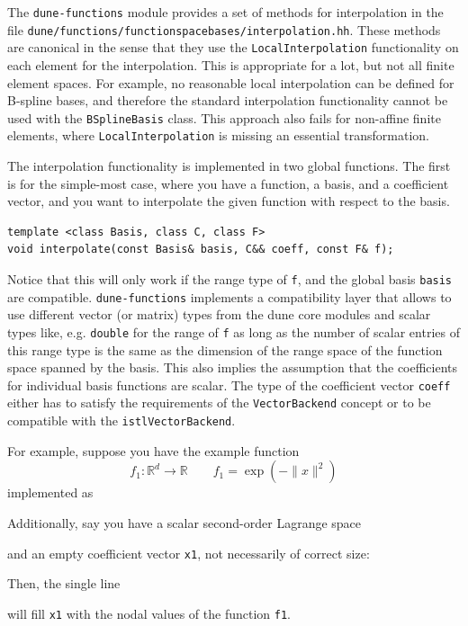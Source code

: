 \documentclass[a4paper,10pt,headings=normal,bibliography=totoc]{scrartcl}
\newcommand{\cpp}[1]{\lstinline[basicstyle=\ttfamily]!#1!}
\newcommand{\R}{\mathbb{R}}
\newcommand{\norm}[1]{\lVert#1\rVert}
\newcommand{\dunemodule}[1]{\texttt{#1}}
\newcommand{\file}[1]{\texttt{#1}}
\begin{document}
The \dunemodule{dune-functions} module provides a set of methods for interpolation in the file
\file{dune/functions/functionspacebases/interpolation.hh}.  These methods are canonical in the sense that
they use the \cpp{LocalInterpolation} functionality on each element for the interpolation.  This is appropriate
for a lot, but not all finite element spaces.  For example, no reasonable local interpolation can be defined
for B-spline bases, and therefore the standard interpolation functionality cannot be used with the
\cpp{BSplineBasis} class.
This approach also fails for non-affine finite elements, where \cpp{LocalInterpolation} is
missing an essential transformation.

The interpolation functionality is implemented in two global functions.
The first is for the simple-most case, where you have a function,
a basis, and a coefficient vector, and you want to interpolate
the given function with respect to the basis.

\begin{lstlisting}[style=Interface]
template <class Basis, class C, class F>
void interpolate(const Basis& basis, C&& coeff, const F& f);
\end{lstlisting}

Notice that this will only work if the range type of \cpp{f},
and the global basis \cpp{basis} are compatible.
\dunemodule{dune-functions} implements a compatibility layer
that allows to use different vector (or matrix) types
from the dune core modules and scalar types like, e.g. \cpp{double}
for the range of \cpp{f} as long as the number of scalar entries
of this range type is the same as the dimension of the range space of
the function space spanned by the basis.
This also implies the assumption that the coefficients for
individual basis functions are scalar.
The type of the coefficient vector \cpp{coeff}
either has to satisfy the requirements of the \cpp{VectorBackend}
concept or to be compatible with the
\cpp{istlVectorBackend}.

For example, suppose you have the example function
\begin{equation*}
 f_1 : \R^d \to \R
 \qquad
 f_1 =  \exp(-\norm{x}^2)
\end{equation*}
implemented as
%

%
Additionally, say you have a scalar second-order Lagrange space
%

%
and an empty coefficient vector \cpp{x1}, not necessarily of correct size:
%

%
Then, the single line
%

%
will fill \cpp{x1} with the nodal values of the function \cpp{f1}.
\end{document}

